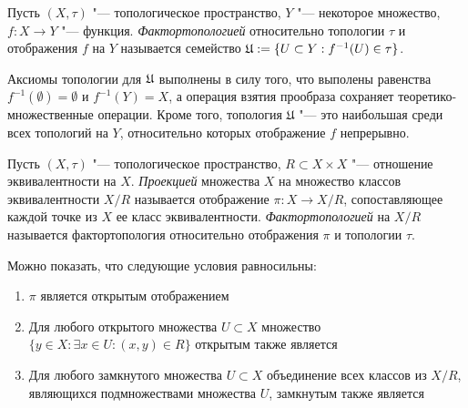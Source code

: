 \begin{definition}
	Пусть $(X, \tau)$ "--- топологическое пространство, $Y$ "--- некоторое множество, $f : X \to Y$ "--- функция. \textit{Фактортопологией} относительно топологии $\tau$ и отображения $f$ на $Y$ называется семейство $\mathfrak U := \{U \subset Y: f^{-1}(U) \in \tau\}$.
\end{definition}

\begin{note}
	Аксиомы топологии для $\mathfrak U$ выполнены в силу того, что выполены равенства $f^{-1}(\emptyset) = \emptyset$ и $f^{-1}(Y) = X$, а операция взятия прообраза сохраняет теоретико-множественные операции. Кроме того, топология $\mathfrak{U}$ "--- это наибольшая среди всех топологий на $Y$, относительно которых отображение $f$ непрерывно.
\end{note}

\begin{definition}
	Пусть $(X, \tau)$ "--- топологическое пространство, $R \subset X\times X$ "--- отношение эквивалентности на $X$. \textit{Проекцией} множества $X$ на множество классов эквивалентности $X / R$ называется отображение $\pi: X \to X / R$, сопоставляющее каждой точке из $X$ ее класс эквивалентности. \textit{Фактортопологией} на $X / R$ называется фактортопология относительно отображения $\pi$ и топологии $\tau$.
\end{definition}

\begin{note}
	Можно показать, что следующие условия равносильны:
	\begin{enumerate}
		\item $\pi$ является открытым отображением
		
		\item Для любого открытого множества $U \subset X$ множество $\{y \in X: \exists x \in U: (x,y) \in R\}$ открытым также является
		
		\item Для любого замкнутого множества $U \subset X$ объединение всех классов из $X/R$, являющихся подмножествами множества $U$, замкнутым также является
	\end{enumerate}
\end{note}